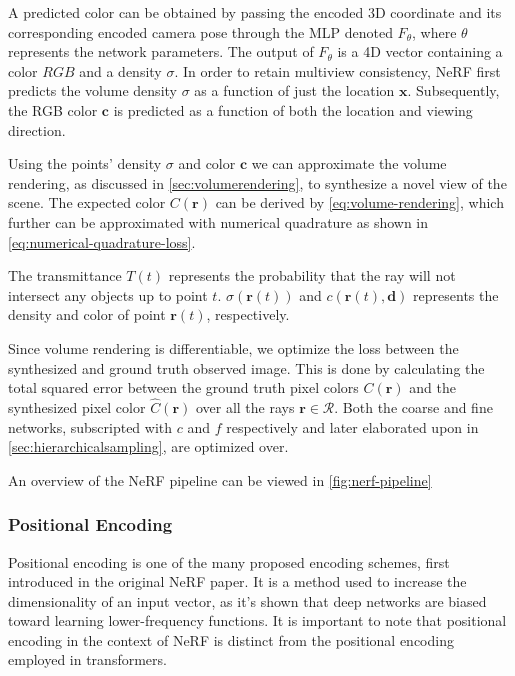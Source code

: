 

A predicted color can be obtained by passing the encoded 3D coordinate and its corresponding encoded camera pose through the MLP denoted $F_{\theta}$, where $\theta$ represents the network parameters. The output of $F_\theta$ is a 4D vector containing a color $RGB$ and a density $\sigma$. In order to retain multiview consistency, NeRF first predicts the volume density $\sigma$ as a function of just the location $\textbf{x}$. Subsequently, the RGB color $\pmb{c}$ is predicted as a function of both the location and viewing direction.


Using the points' density $\sigma$ and color $\pmb{c}$ we can approximate the volume rendering, as discussed in \autoref{sec:volumerendering}, to synthesize a novel view of the scene. The expected color $C(\pmb{r})$ can be derived by \autoref{eq:volume-rendering}, which further can be approximated with numerical quadrature as shown in \autoref{eq:numerical-quadrature-loss}.





The transmittance $T(t)$ represents the probability that the ray will not intersect any objects up to point $t$. $\sigma(\pmb{r}(t))$ and $c(\pmb{r}(t), \pmb{d})$ represents the density and color of point $\pmb{r}(t)$, respectively.

Since volume rendering is differentiable, we optimize the loss between the synthesized and ground truth observed image. This is done by calculating the total squared error between the ground truth pixel colors $C(\pmb{r})$ and the synthesized pixel color $\hat{C}(\pmb{r})$ over all the rays $\pmb{r} \in \mathcal{R}$. Both the coarse and fine networks, subscripted with $c$ and $f$ respectively and later elaborated upon in \autoref{sec:hierarchicalsampling}, are optimized over.



An overview of the NeRF pipeline can be viewed in \autoref{fig:nerf-pipeline}



\subsubsection{Positional Encoding} \label{sec:positionalencoding}
Positional encoding is one of the many proposed encoding schemes, first introduced in the original NeRF paper. It is a method used to increase the dimensionality of an input vector, as it's shown that deep networks are biased toward learning lower-frequency functions. It is important to note that positional encoding in the context of NeRF is distinct from the positional encoding employed in transformers.


